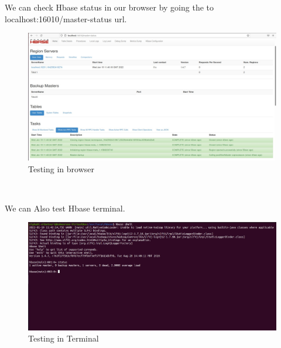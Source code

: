 \begin{spacing}{1.2}
\par We can check Hbase status in our browser by going the to localhost:16010/master-status
 url.
\\
\begin{figure}[!htb] 
\begin{center} 
\includegraphics[width=1\linewidth]{Pictures/HBase/Configuring Hbase in Standalone & Pseudo-distributed mode/Configuring Hbase in Pseudo-distributed mode/Testing in browser} 
\end{center} 
\caption{Testing in browser} 
\end{figure}  \FloatBarrier
\\

\par We can Also test Hbase terminal.
\\
\begin{figure}[!htb] 
\begin{center} 
\includegraphics[width=1\linewidth]{Pictures/HBase/Configuring Hbase in Standalone & Pseudo-distributed mode/Configuring Hbase in Pseudo-distributed mode/Testing in Terminal} 
\end{center} 
\caption{Testing in Terminal} 
\end{figure}  \FloatBarrier
\\

\end{spacing}